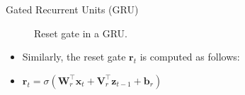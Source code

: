 \begin{vbframe}{Gated Recurrent Units (GRU)}
    \begin{figure}
      \centering
      \caption{\footnotesize{Reset gate in a GRU.}}
  \end{figure}
  \begin{itemize}
    \item Similarly, the reset gate $\mathbf{r}_t$ is computed as follows:
   \item $\mathbf{r}_t = \sigma(\bm{W}_{r}^\top \mathbf{x}_t +\bm{V}_{r}^\top \mathbf{z}_{t-1} + \mathbf{b}_r)$

  \end{itemize}
\end{vbframe}

